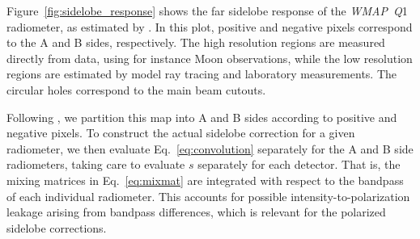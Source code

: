 \documentclass[twocolumn]{aa}
\def\WMAP{\emph{WMAP}}
\newcommand{\Q}[0]{\textit Q}
\begin{document}
Figure~\ref{fig:sidelobe_response} shows the far sidelobe response of the
\WMAP\ \Q1 radiometer, as estimated by \citet{barnes2003}. In this plot,
positive and negative pixels correspond to the A and B sides, respectively. The
high resolution regions are measured directly from data, using for instance
Moon observations, while the low resolution regions are estimated by model ray
tracing and laboratory measurements. The circular holes correspond to the main
beam cutouts.

Following \citet{barnes2003}, we partition this map into A and B sides
according to positive and negative pixels. 
To construct the actual sidelobe correction for a given radiometer, we
then evaluate Eq.~\eqref{eq:convolution} separately for the A and B
side radiometers, taking care to evaluate $s$ separately for each
detector. That is, the mixing matrices in Eq.~\eqref{eq:mixmat} are
integrated with respect to the bandpass of each individual radiometer. This
accounts for possible intensity-to-polarization leakage arising from bandpass
differences, which is relevant for the polarized sidelobe
corrections. 
\end{document}
